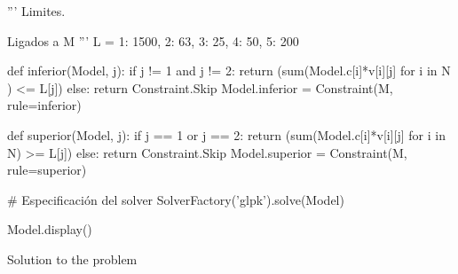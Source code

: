 \documentclass{textbook}
\begin{document}
{    '''
    Limites.
    
    Ligados a M
    '''
    L = {
        1: 1500,
        2: 63,
        3: 25,
        4: 50,
        5: 200
    }
    
    def inferior(Model, j):
        if j != 1 and j != 2:
            return (sum(Model.c[i]*v[i][j] for i in N ) <= L[j]) 
        else:
            return Constraint.Skip    
    Model.inferior = Constraint(M, rule=inferior)
    
    def superior(Model, j):
        if j == 1 or j == 2:
            return (sum(Model.c[i]*v[i][j] for i in N) >= L[j])
        else:
            return Constraint.Skip
    Model.superior = Constraint(M, rule=superior)
    
    # Especificación del solver
    SolverFactory('glpk').solve(Model)
    
    Model.display()
}{Solution to the problem}
\end{document}
